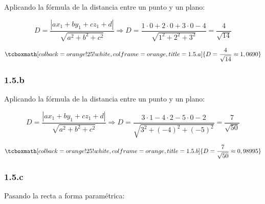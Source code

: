 \documentclass{article}
\begin{document}
Aplicando la fórmula de la distancia entre un punto y un plano:

\begin{equation}
D = \frac{|a x_1 + b y_1 + c z_1 + d|}{\sqrt{a^2 + b^2 + c^2}} \Rightarrow D = \frac{1 \cdot 0 + 2 \cdot 0 + 3 \cdot 0 - 4}{\sqrt{1^2 + 2^2 + 3^2}} = \frac{4}{\sqrt{14}}
\end{equation}

\begin{equation}
\tcboxmath[colback=orange!25!white,colframe=orange,title=1.5.a]
{ D = \frac{4}{\sqrt{14}} \approx 1,0690 }
\end{equation}

\subsubsection*{1.5.b}
\label{subsubsec:1.5.b}

Aplicando la fórmula de la distancia entre un punto y un plano:

\begin{equation}
D = \frac{|a x_1 + b y_1 + c z_1 + d|}{\sqrt{a^2 + b^2 + c^2}} \Rightarrow D = \frac{3 \cdot 1 - 4 \cdot 2 - 5 \cdot 0 - 2}{\sqrt{3^2 + (-4)^2 + (-5)^2}} = \frac{7}{\sqrt{50}}
\end{equation}

\begin{equation}
\tcboxmath[colback=orange!25!white,colframe=orange,title=1.5.b]
{ D = \frac{7}{\sqrt{50}} \approx 0,98995 }
\end{equation}

\subsubsection*{1.5.c}
\label{subsubsec:1.5.c}

Pasando la recta a forma paramétrica:
\end{document}
